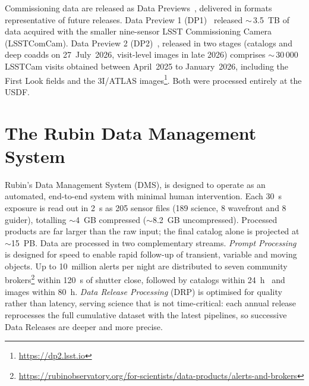 Commissioning data are released as Data Previews~\cite{RTN-011}, delivered in formats representative of future releases.
Data Preview 1 (DP1)~\cite{2026AJ....171..360V} released $\sim$\,3.5~TB of data acquired with the smaller nine-sensor LSST Commissioning Camera (LSSTComCam).
Data Preview 2 (DP2)~\cite{RTN-115}, released in two stages (catalogs and deep coadds on 27~July~2026, visit-level images in late 2026)  comprises $\sim$\,30\,000 LSSTCam visits obtained between April~2025 to January~2026, including the First Look fields and the 3I/ATLAS images\footnote{\url{https://dp2.lsst.io}}.
Both were processed entirely at the USDF.
%
\section{The Rubin Data Management System}
\label{sec:ecosystem}

Rubin's Data Management System (DMS),
is designed to operate as an automated, end-to-end system with minimal human intervention.
Each 30~s exposure is read out in 2~s as 205 sensor files (189 science, 8 wavefront and 8 guider), totalling $\sim$4~GB compressed ($\sim$8.2~GB uncompressed).
Processed products are far larger than the raw input; the final catalog alone is projected at $\sim$15~PB.
Data are processed in two complementary streams.
\textit{Prompt Processing}~\cite{2026arXiv260319541F} is designed for speed to enable rapid follow-up of transient, variable and moving objects.
Up to 10~million alerts per night are distributed to seven community brokers\footnote{\url{https://rubinobservatory.org/for-scientists/data-products/alerts-and-brokers}} within 120~s of shutter close, followed by catalogs within 24~h~\cite{DMTN-293} and images within 80~h.
\textit{Data Release Processing} (DRP) is optimised for quality rather than latency, serving science that is not time-critical: each annual release reprocesses the full cumulative dataset with the latest pipelines, so successive Data Releases  are deeper and more precise.
%

